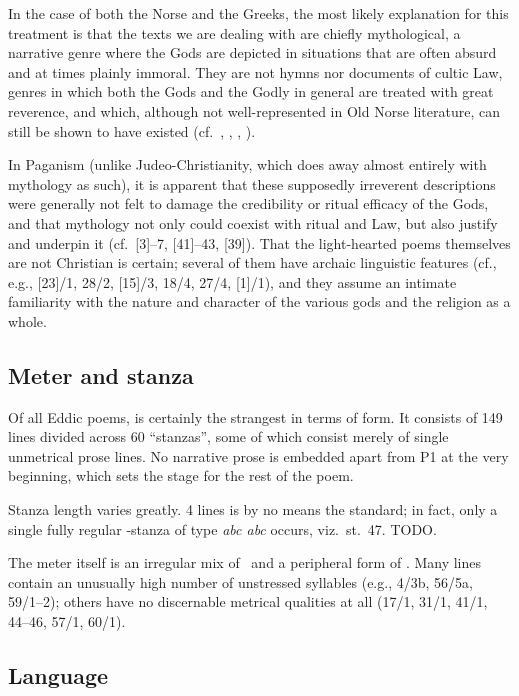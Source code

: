 In the case of both the Norse and the Greeks, the most likely explanation for this treatment is that the texts we are dealing with are chiefly mythological, a narrative genre where the Gods are depicted in situations that are often absurd and at times plainly immoral.  They are not hymns nor documents of cultic Law, genres in which both the Gods and the Godly in general are treated with great reverence, and which, although not well-represented in Old Norse literature, can still be shown to have existed (cf.~\cite{Läffler1895}, \cite{Lindow1988}, \textcite{Ruthstrom1990}, \cite{Nordberg2005}).

In Paganism (unlike Judeo-Christianity, which does away almost entirely with mythology as such), it is apparent that these supposedly irreverent descriptions were generally not felt to damage the credibility or ritual efficacy of the Gods, and that mythology not only could coexist with ritual and Law, but also justify and underpin it (cf.~[3]--7, [41]--43, [39]).  That the light-hearted poems themselves are not Christian is certain; several of them have archaic linguistic features (cf., e.g., [23]/1, 28/2, [15]/3, 18/4, 27/4, [1]/1), and they assume an intimate familiarity with the nature and character of the various gods and the religion as a whole.

\subsection{Meter and stanza}

Of all Eddic poems,  is certainly the strangest in terms of form.  It consists of 149 lines divided across 60 “stanzas”, some of which consist merely of single unmetrical prose lines.  No narrative prose is embedded apart from P1 at the very beginning, which sets the stage for the rest of the poem.

Stanza length varies greatly.  4 lines is by no means the standard; in fact, only a single fully regular \Ljodahattr-stanza of type \emph{abc abc} occurs, viz.~st.~47.  TODO.

The meter itself is an irregular mix of \Ljodahattr\ and a peripheral form of \Malahattr.  Many lines contain an unusually high number of unstressed syllables (e.g., 4/3b, 56/5a, 59/1--2); others have no discernable metrical qualities at all (17/1, 31/1, 41/1, 44--46, 57/1, 60/1).

\subsection{Language}

